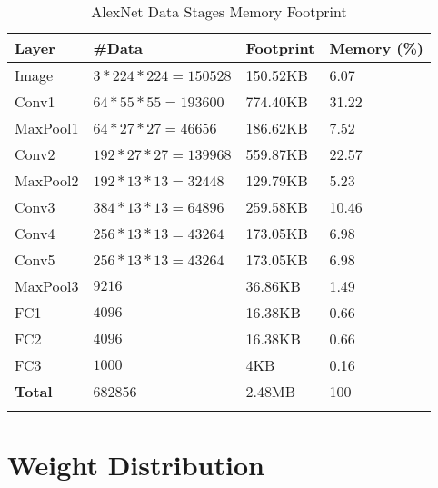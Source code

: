 \begin{table}[H]
	\caption{AlexNet Data Stages Memory Footprint}
	\label{tab:AlexNet-Data-Stages-Memory-Footprint}
	\centering
	\begin{tabular}{llll}
		\toprule
		\textbf{Layer} & \textbf{\#Data} & \textbf{Footprint} & \textbf{Memory (\%)}  \\
		\midrule
			Image & $3 * 224 * 224 = 150528$ & 150.52KB & 6.07 \\
			Conv1 & $64 * 55 * 55 = 193600$ & 774.40KB & 31.22 \\
			MaxPool1 & $64 * 27 * 27 = 46656$ & 186.62KB & 7.52 \\
			Conv2 & $192 * 27 * 27 = 139968$ & 559.87KB & 22.57 \\
			MaxPool2 & $192 * 13 * 13 = 32448$ & 129.79KB & 5.23 \\
			Conv3 & $384 * 13 * 13 = 64896$ & 259.58KB & 10.46 \\
			Conv4 & $256 * 13 * 13 = 43264$ & 173.05KB & 6.98 \\
			Conv5 & $256 * 13 * 13 = 43264$ & 173.05KB & 6.98 \\
			MaxPool3 & $9216$ & 36.86KB & 1.49 \\
			FC1 & $4096$ & 16.38KB & 0.66 \\
			FC2 & $4096$ & 16.38KB & 0.66 \\
			FC3 & $1000$ & 4KB & 0.16 \\
		\midrule
			\textbf{Total} & 682856 & 2.48MB & 100 \\
		\bottomrule\\
	\end{tabular}
\end{table}

\section{Weight Distribution}
